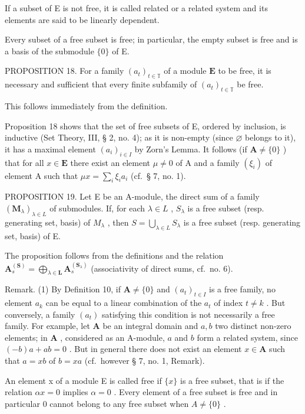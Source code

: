 If a subset of E is not free, it is called related or a related system and its elements are said to be linearly dependent.

Every subset of a free subset is free; in particular, the empty subset is free and is a basis of the submodule \(\{0\}\) of E.

PROPOSITION 18. For a family \((a_{t})_{t\in \mathbb{T}}\) of a module \(\mathbf{E}\) to be free, it is necessary and sufficient that every finite subfamily of \((a_{t})_{t\in \mathbb{T}}\) be free.

This follows immediately from the definition.

Proposition 18 shows that the set of free subsets of E, ordered by inclusion, is inductive (Set Theory, III, § 2, no. 4); as it is non-empty (since \(\varnothing\) belongs to it), it has a maximal element \((a_{i})_{i\in I}\) by Zorn's Lemma. It follows (if \(\mathbf{A}\neq \{0\}\) ) that for all \(x\in \mathbf{E}\) there exist an element \(\mu \neq 0\) of A and a family \((\xi_{i})\) of element A such that \(\mu x = \sum_{i}\xi_{i}a_{i}\) (cf.~§ 7, no. 1).

PROPOSITION 19. Let E be an A-module, the direct sum of a family \((\mathbf{M}_{\lambda})_{\lambda \in L}\) of submodules. If, for each \(\lambda \in L\) , \(S_{\lambda}\) is a free subset (resp. generating set, basis) of \(M_{\lambda}\) , then \(S = \bigcup_{\lambda \in L} S_{\lambda}\) is a free subset (resp. generating set, basis) of E.

The proposition follows from the definitions and the relation \(\mathbf{A}_{s}^{(\mathbf{S})} = \bigoplus_{\lambda \in \mathbf{L}} \mathbf{A}_{s}^{(\mathbf{S}_{\lambda})}\) (associativity of direct sums, cf.~no. 6).

Remark. (1) By Definition 10, if \(\mathbf{A} \neq \{0\}\) and \((a_{t})_{t \in I}\) is a free family, no element \(a_{k}\) can be equal to a linear combination of the \(a_{t}\) of index \(t \neq k\) . But conversely, a family \((a_{t})\) satisfying this condition is not necessarily a free family. For example, let \(\mathbf{A}\) be an integral domain and \(a, b\) two distinct non-zero elements; in \(\mathbf{A}\) , considered as an A-module, \(a\) and \(b\) form a related system, since \((-b)a + ab = 0\) . But in general there does not exist an element \(x \in \mathbf{A}\) such that \(a = xb\) of \(b = xa\) (cf.~however § 7, no. 1, Remark).

An element x of a module E is called free if \(\{x\}\) is a free subset, that is if the relation \(\alpha x = 0\) implies \(\alpha = 0\) . Every element of a free subset is free and in particular 0 cannot belong to any free subset when \(A \neq \{0\}\) .

